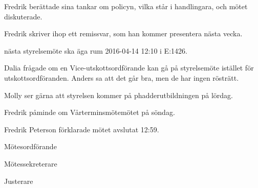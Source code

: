 \documentclass[10pt]{article}
\def\mo{Fredrik Peterson}
\def\ms{Erik Månsson}
\def\ji{Anders Nilsson}
\begin{document}
\begin{paragrafer}
Fredrik berättade sina tankar om policyn, vilka står i handlingara, och
mötet diskuterade.

Fredrik skriver ihop ett remissvar, som han kommer presentera nästa vecka.

\Mba nästa styrelsemöte ska äga rum 2016-04-14 12:10 i E:1426.

\Ibfu

Dalia frågade om en Vice-utskottsordförande kan gå på styrelsemöte istället för utskottsordföranden. Anders sa att det går bra, men de har ingen rösträtt.

Molly ser gärna att styrelsen kommer på phadderutbildningen på lördag.

Fredrik påminde om Vårterminsmötemötet på söndag.

{\mo} förklarade mötet avslutat 12:59.

\end{paragrafer}

\hidesignfoot
\begin{signatures}{3}
\signature{\mo}{Mötesordförande}
\signature{\ms}{Mötessekreterare}
\signature{\ji}{Justerare}
\end{signatures}
\end{document}
